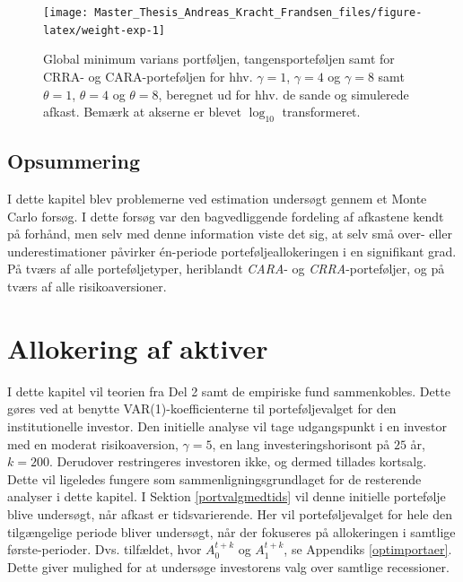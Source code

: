 \documentclass[
  a4paper,
  oneside]{memoir}
\begin{document}
\begin{figure}[H]

{\centering \texttt{[image: Master\_Thesis\_Andreas\_Kracht\_Frandsen\_files/figure-latex/weight-exp-1]} 

}

\caption[Afkast-volatilitets spektrummet for simulering.]{Global minimum varians portføljen, tangensporteføljen samt for CRRA- og CARA-porteføljen for hhv. $\gamma=1$, $\gamma=4$ og $\gamma=8$ samt $\theta=1$, $\theta=4$ og $\theta=8$, beregnet ud for hhv. de sande og simulerede afkast. Bemærk at akserne er blevet $\log_{10}$ transformeret.}\label{fig:weight-exp}
\end{figure}

\hypertarget{opsummering-3}{%
\section{Opsummering}\label{opsummering-3}}

I dette kapitel blev problemerne ved estimation undersøgt gennem et Monte Carlo forsøg. I dette forsøg var den bagvedliggende fordeling af afkastene kendt på forhånd, men selv med denne information viste det sig, at selv små over- eller underestimationer påvirker én-periode porteføljeallokeringen i en signifikant grad. På tværs af alle porteføljetyper, heriblandt \emph{CARA}- og \emph{CRRA}-porteføljer, og på tværs af alle risikoaversioner.

\hypertarget{alloafakt}{%
\chapter{Allokering af aktiver}\label{alloafakt}}

I dette kapitel vil teorien fra Del 2 samt de empiriske fund sammenkobles. Dette gøres ved at benytte VAR(1)-koefficienterne til porteføljevalget for den institutionelle investor. Den initielle analyse vil tage udgangspunkt i en investor med en moderat risikoaversion, \(\gamma=5\), en lang investeringshorisont på \(25\) år, \(k=200\). Derudover restringeres investoren ikke, og dermed tillades kortsalg. Dette vil ligeledes fungere som sammenligningsgrundlaget for de resterende analyser i dette kapitel. I Sektion \ref{portvalgmedtids} vil denne initielle portefølje blive undersøgt, når afkast er tidsvarierende. Her vil porteføljevalget for hele den tilgængelige periode bliver undersøgt, når der fokuseres på allokeringen i samtlige første-perioder. Dvs. tilfældet, hvor \(A_0^{t+k}\) og \(A_1^{t+k}\), se Appendiks \ref{optimportaer}. Dette giver mulighed for at undersøge investorens valg over samtlige recessioner.
\end{document}
